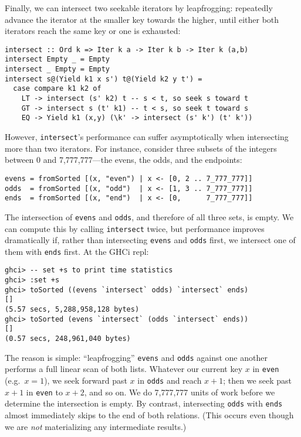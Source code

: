 \documentclass[acmsmall,screen,review,anonymous,dvipsnames,svgnames]{acmart}
\newcommand\ttt\texttt
\begin{document}
\noindent
Finally, we can intersect two seekable iterators by leapfrogging: repeatedly advance the iterator at the smaller key towards the higher, until either both iterators reach the same key or one is exhausted:

\begin{verbatim}
intersect :: Ord k => Iter k a -> Iter k b -> Iter k (a,b)
intersect Empty _ = Empty
intersect _ Empty = Empty
intersect s@(Yield k1 x s') t@(Yield k2 y t') =
  case compare k1 k2 of
    LT -> intersect (s' k2) t -- s < t, so seek s toward t
    GT -> intersect s (t' k1) -- t < s, so seek t toward s
    EQ -> Yield k1 (x,y) (\k' -> intersect (s' k') (t' k'))
\end{verbatim}

\noindent
However, \ttt{intersect}'s performance can suffer asymptotically when intersecting more than two iterators.
For instance, consider three subsets of the integers between 0 and 7,777,777---the evens, the odds, and the endpoints:

\begin{verbatim}
evens = fromSorted [(x, "even") | x <- [0, 2 .. 7_777_777]]
odds  = fromSorted [(x, "odd")  | x <- [1, 3 .. 7_777_777]]
ends  = fromSorted [(x, "end")  | x <- [0,      7_777_777]]
\end{verbatim}

\noindent
The intersection of \ttt{evens} and \ttt{odds}, and therefore of all three sets, is empty.
We can compute this by calling \ttt{intersect} twice, but performance improves dramatically if, rather than intersecting \ttt{evens} and \ttt{odds} first, we intersect one of them with \ttt{ends} first.
At the GHCi repl:

\begin{verbatim}
ghci> -- set +s to print time statistics
ghci> :set +s
ghci> toSorted ((evens `intersect` odds) `intersect` ends)
[]
(5.57 secs, 5,288,958,128 bytes)
ghci> toSorted (evens `intersect` (odds `intersect` ends))
[]
(0.57 secs, 248,961,040 bytes)
\end{verbatim}

\noindent
The reason is simple: ``leapfrogging'' \ttt{evens} and \ttt{odds} against one another performs a full linear scan of both lists.
Whatever our current key $x$ in \ttt{even} (e.g.\ $x = 1$), we seek forward past $x$ in \ttt{odds} and reach $x+1$; then we seek past $x+1$ in \ttt{even} to $x + 2$, and so on.
We do 7,777,777 units of work before we determine the intersection is empty.
%
By contrast, intersecting \ttt{odds} with \ttt{ends} almost immediately skips to the end of both relations.
(This occurs even though we are \emph{not} materializing any intermediate results.)%
\footnotemark{}
\end{document}
